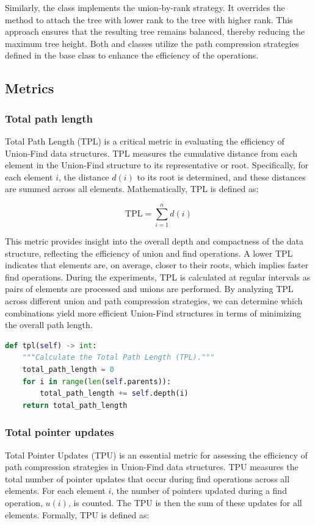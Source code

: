 \documentclass[10pt,a4paper,hidelinks]{article}
\begin{document}
Similarly, the  class implements the union-by-rank strategy. It overrides the  method to attach the tree with lower rank to the tree with higher rank. This approach ensures that the resulting tree remains balanced, thereby reducing the maximum tree height. Both  and  classes utilize the path compression strategies defined in the base class to enhance the efficiency of the  operations.

\subsection{Metrics}
\subsubsection{Total path length}
Total Path Length (TPL) is a critical metric in evaluating the efficiency of Union-Find data structures. TPL measures the cumulative distance from each element in the Union-Find structure to its representative or root. Specifically, for each element $i$, the distance $d(i)$ to its root is determined, and these distances are summed across all elements. Mathematically, TPL is defined as:

$$\text{TPL} = \sum_{i=1}^{n} d(i)$$

This metric provides insight into the overall depth and compactness of the data structure, reflecting the efficiency of union and find operations. A lower TPL indicates that elements are, on average, closer to their roots, which implies faster find operations. During the experiments, TPL is calculated at regular intervals as pairs of elements are processed and unions are performed. By analyzing TPL across different union and path compression strategies, we can determine which combinations yield more efficient Union-Find structures in terms of minimizing the overall path length.

\begin{lstlisting}[language=Python, caption=Python implementation of TPL]
def tpl(self) -> int:
    """Calculate the Total Path Length (TPL)."""
    total_path_length = 0
    for i in range(len(self.parents)):
        total_path_length += self.depth(i)
    return total_path_length
\end{lstlisting}

\subsubsection{Total pointer updates}
Total Pointer Updates (TPU) is an essential metric for assessing the efficiency of path compression strategies in Union-Find data structures. TPU measures the total number of pointer updates that occur during find operations across all elements. For each element $i$, the number of pointers updated during a find operation, $u(i)$, is counted. The TPU is then the sum of these updates for all elements. Formally, TPU is defined as:
\end{document}
